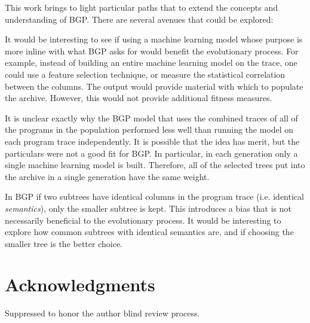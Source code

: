 This work brings to light particular paths  that to extend the concepts and understanding of BGP.  There are several avenues that could be explored:
\begin{inparaenum}
\item  
It would be interesting to see if using a machine learning model whose purpose is more inline with what BGP asks for would benefit the evolutionary process.  For example, instead of building an entire machine learning model on the trace, one could use a feature selection technique, or measure the statistical correlation between the columns.  The output would provide material with which to populate the archive.  However, this would not provide additional fitness measures.

\item
It is unclear exactly why the BGP model that uses the combined traces of all of the programs in the population performed less well than running the model on each program trace independently.  It is possible that the idea has merit, but the particulars were not a good fit for BGP.  In particular, in each generation only a single machine learning model is built.  Therefore, all of the selected trees put into the archive in a single generation have the same weight.

\item
In BGP if two subtrees have identical columns in the program trace (i.e. identical \textit{semantics}), only the smaller subtree is kept.  This introduces a bias that is not necessarily beneficial to the evolutionary process.  It would be interesting to explore how common subtrees with identical semantics are, and if choosing the smaller tree is the better choice.
\end{inparaenum}

\section*{Acknowledgments} Suppressed to honor the author blind review process.

